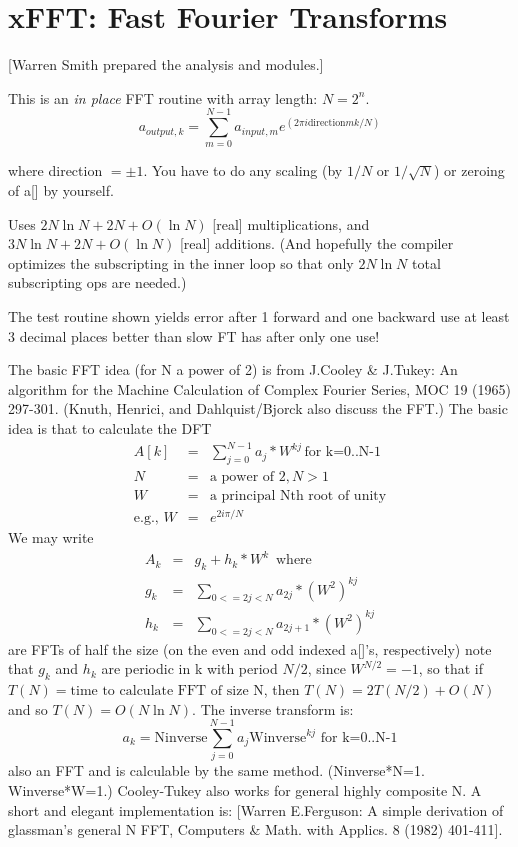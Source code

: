 \section{xFFT: Fast Fourier Transforms}
[Warren Smith prepared the analysis and modules.]

This is an {\em in place} FFT routine with array length:  $N = 2^n$.
\begin{equation}
 a_{output,k} = \sum_{m=0}^{N-1} a_{input,m} 
        e^{(2 \pi i \mbox{direction} m k/N)}
\end{equation}

where direction $= \pm 1$.
You have to do any scaling (by $1/N$ or $1/\sqrt{N}$) or zeroing of a[] by
yourself. 

Uses $2N \ln N + 2 N + O(\ln N)$ [real] multiplications, 
and $ 3N \ln N + 2 N + O(\ln N)$ [real] additions.
(And hopefully the compiler optimizes the subscripting in the inner loop so
that only $2 N \ln N$ total subscripting ops are needed.)

The test routine shown yields
error after 1 forward and one backward use
at least 3 decimal places better than
slow FT has after only one use!

The basic FFT idea (for N a power of 2) is from J.Cooley \& J.Tukey:
An algorithm for the Machine Calculation of Complex Fourier Series,
MOC 19 (1965) 297-301. (Knuth, Henrici, and Dahlquist/Bjorck also discuss
the FFT.) The basic idea is that to calculate the DFT
\begin{eqnarray}
    A[k]  & = & \sum_{j=0}^{N-1}a_j*W^{kj}  \, \mbox{for k=0..N-1}\\
    N & = & \mbox{a power of 2,}\, N>1\\
    W & = & \mbox{a principal Nth root of unity}\\
   \mbox{e.g., } W & = & e^{2 i \pi/N}
\end{eqnarray}
We may write
\begin{eqnarray}
    A_k & = & g_k + h_k * W^k \, \mbox{ where}\\
    g_k & = & \sum_{0<=2j<N} a_{2j}   * (W^2)^{k j}\\
    h_k & = & \sum_{0<=2j<N} a_{2j+1} * (W^2)^{k j}
\end{eqnarray}
are FFTs of half the size (on the even and odd indexed a[]'s, respectively)
note that $g_k$ and $h_k$ are periodic in k with period $N/2$, 
since $W^{N/2} = -1$,
so that if $T(N)=\mbox{time to calculate FFT of size N}$, then 
$T(N)=2T(N/2)+O(N)$ and so $T(N)=O(N \ln N)$. The inverse transform is:
\begin{equation}
    a_k  =  \mbox{Ninverse}  \sum_{j=0}^{N-1} a_j 
              \mbox{Winverse}^{k j} \mbox{  for k=0..N-1}
\end{equation}
also an FFT and is calculable by the same method. (Ninverse*N=1. Winverse*W=1.)
Cooley-Tukey also works for general highly composite N.
A short and elegant implementation is:
[Warren E.Ferguson: A simple derivation of glassman's general N FFT,
Computers \& Math. with Applics. 8 (1982) 401-411].

